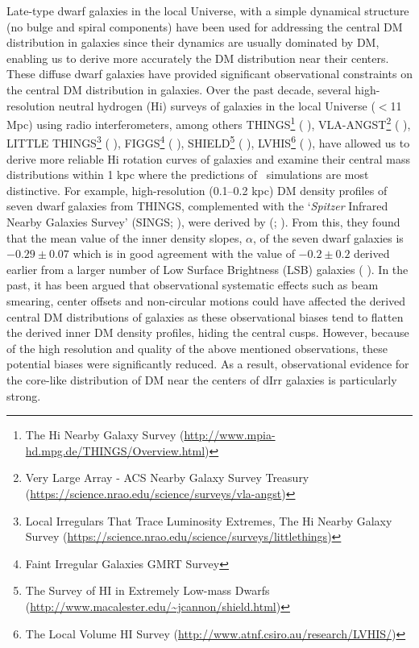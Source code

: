 \documentclass[natbib209]{emulateapj}
\begin{document}
Late-type dwarf galaxies in the local Universe, with a simple dynamical structure 
(no bulge and spiral components)  have been used for addressing the central DM 
distribution in galaxies since their dynamics are usually dominated by DM,
enabling us to derive more accurately the DM distribution near their centers. These
diffuse dwarf galaxies have provided significant observational constraints on the central DM
distribution in galaxies. Over the past decade, several high-resolution neutral hydrogen (H{\sc i})
surveys of galaxies in the local Universe ($<$11 Mpc) using radio
interferometers, among others THINGS\footnote{The H{\sc i} Nearby Galaxy Survey (\url{http://www.mpia-hd.mpg.de/THINGS/Overview.html})} (\citeauthor{Walter_2008}
\citeyear{Walter_2008}), VLA-ANGST\footnote{Very Large Array \-- ACS Nearby Galaxy
Survey Treasury (\url{https://science.nrao.edu/science/surveys/vla-angst})} (\citeauthor{Ott_2012} \citeyear{Ott_2012}),
LITTLE THINGS\footnote{Local Irregulars That Trace Luminosity Extremes, The
H{\sc i} Nearby Galaxy Survey (\url{https://science.nrao.edu/science/surveys/littlethings})} (\citeauthor{Hunter_2012}
\citeyear{Hunter_2012}), FIGGS\footnote{Faint Irregular Galaxies GMRT Survey}
(\citeauthor{Begum_2008} \citeyear{Begum_2008}), SHIELD\footnote{The Survey of
HI in Extremely Low-mass Dwarfs (\url{http://www.macalester.edu/~jcannon/shield.html})} (\citeauthor{Cannon_2011}
\citeyear{Cannon_2011}), LVHIS\footnote{The Local Volume HI Survey (\url{http://www.atnf.csiro.au/research/LVHIS/})}
(\citeauthor{Koribalski_2010} \citeyear{Koribalski_2010}), have allowed us
to derive more reliable H{\sc i} rotation curves
of galaxies and examine their central mass distributions within 1 kpc where the
predictions of \LCDM\ simulations are most distinctive.
For example, high-resolution (0.1--0.2 kpc) DM density profiles of seven
dwarf galaxies from THINGS, complemented with the `{\it Spitzer} Infrared
Nearby Galaxies Survey' (SINGS; \citeauthor{Kennicutt_2003}
\citeyear{Kennicutt_2003}), were derived by \citeauthor{Oh_2008}
(\citeyear{Oh_2008}; \citeyear{Oh_2011a}). From this, they found that the mean value of the inner density
slopes, $\alpha$, of the seven dwarf galaxies is $-0.29\pm0.07$ which is in good
agreement with the value of $-0.2\pm0.2$ derived earlier from a larger number of Low Surface
Brightness (LSB) galaxies (\citeauthor{deBlok_2002} \citeyear{deBlok_2002}). In the past,
it has been argued that observational systematic effects such as beam smearing, center 
offsets and non-circular motions could have affected the
derived central DM distributions of galaxies as these observational biases
tend to flatten the derived inner DM density profiles,
hiding the central cusps. However, because of the high resolution and quality of the
above mentioned observations, these potential biases were significantly 
reduced. As a result, observational evidence for the core-like distribution of DM 
near the centers of dIrr galaxies is particularly strong.
\end{document}
